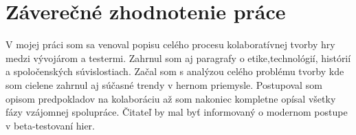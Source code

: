 \documentclass[10pt,twoside,slovak,a4paper]{article}
\begin{document}
\section{Záverečné zhodnotenie práce} \label{zaver}
V mojej práci som sa venoval popisu celého procesu kolaboratívnej tvorby hry medzi vývojárom a testermi. Zahrnul som aj paragrafy o etike,technológií, histórií a spoločenských súvislostiach. Začal som s analýzou celého problému tvorby kde som cielene zahrnul aj súčasné trendy v hernom priemysle. Postupoval som opisom predpokladov na kolaboráciu až som nakoniec kompletne opísal všetky fázy vzájomnej spolupráce. Čitateľ by mal byť informovaný o modernom postupe v beta-testovaní hier. 



\end{document}
